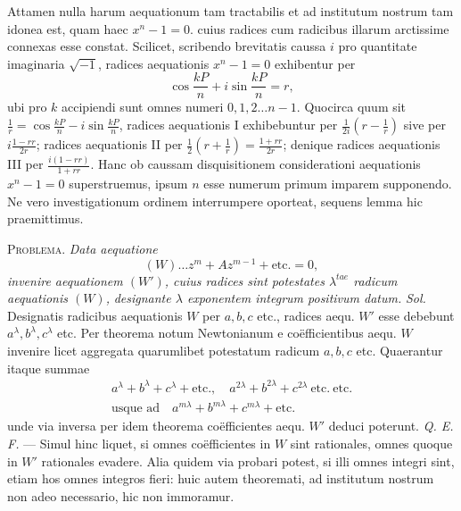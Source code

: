 Attamen nulla harum aequationum tam tractabilis et ad institutum nostrum tam idonea est, quam haec \(x^n-1=0\). cuius radices cum radicibus illarum arctissime connexas esse constat. Scilicet, scribendo brevitatis caussa \(i\) pro quantitate imaginaria \(\surd{-1}\), radices aequationis \(x^n-1=0\) exhibentur per \[\cos\frac{kP}n+i\sin\frac{kP}n=r,\]
ubi pro \(k\) accipiendi sunt omnes numeri \(0,\allowbreak 1,\allowbreak 2\ldots n-1\). Quocirca quum sit \(\frac1r=\cos\frac{kP}n-i\sin\frac{kP}n\), radices aequationis I exhibebuntur per \(\frac1{2i}(r-\frac1r)\) sive per \(i\frac{1-rr}{2r}\); radices aequationis II per \(\frac12(r+\frac1r)=\frac{1+rr}{2r}\); denique radices aequationis III per \(\frac{i(1-rr)}{1+rr}\). Hanc ob caussam disquisitionem considerationi aequationis \(x^n-1=0\) superstruemus, ipsum \(n\) esse numerum primum imparem supponendo. Ne vero investigationum ordinem interrumpere oporteat, sequens lemma hic praemittimus.

\textsc{Problema.} \textit{Data aequatione} \[(W)\ldots z^m+Az^{m-1}+\mathrm{etc.}=0,\] \textit{invenire aequationem \((W')\), cuius radices sint potestates \(\lambda^{tae}\) radicum aequationis \((W)\),} \textit{designante \(\lambda\) exponentem integrum positivum datum.} \textit{Sol.} Designatis radicibus aequationis \(W\) per \(a,\allowbreak b,\allowbreak c\) etc., radices aequ. \(W'\) esse debebunt \(a^\lambda,\allowbreak b^\lambda,\allowbreak c^\lambda\) etc. Per theorema notum Newtonianum e coëfficientibus aequ. \(W\) invenire licet aggregata quarumlibet potestatum radicum \(a,\allowbreak b,\allowbreak c\) etc. Quaerantur itaque summae \[\begin{gathered}
a^\lambda+b^\lambda+c^\lambda+\mathrm{etc.},\quad
a^{2\lambda}+b^{2\lambda}+c^{2\lambda}\ \mathrm{etc.}\ \mathrm{etc.}\\
\text{usque ad}\quad a^{m\lambda}+b^{m\lambda}+c^{m\lambda}+\mathrm{etc.}
\end{gathered}\] unde via inversa per idem theorema coëfficientes aequ. \(W'\) deduci poterunt. \textit{Q. E. F.} — Simul hinc liquet, si omnes coëfficientes in \(W\) sint rationales, omnes quoque in \(W'\) rationales evadere. Alia quidem via probari potest, si illi omnes integri sint, etiam hos omnes integros fieri: huic autem theoremati, ad institutum nostrum non adeo necessario, hic non immoramur.

